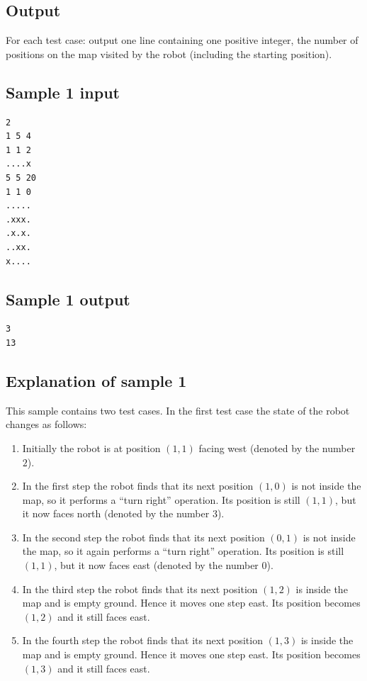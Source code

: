 \documentclass[11pt]{article}
\begin{document}
\subsection*{Output}

For each test case: output one line containing one positive integer, the
number of positions on the map visited by the robot (including the starting
position).

\subsection*{Sample 1 input}

\begin{verbatim}
2
1 5 4
1 1 2
....x
5 5 20
1 1 0
.....
.xxx.
.x.x.
..xx.
x....
\end{verbatim}

\subsection*{Sample 1 output}

\begin{verbatim}
3
13
\end{verbatim}

\subsection*{Explanation of sample 1}

This sample contains two test cases.
In the first test case the state of the robot changes as follows:
\begin{enumerate}
\item Initially the robot is at position $(1, 1)$ facing west (denoted by
the number $2$).
\item In the first step the robot finds that its next position $(1, 0)$ is
not inside the map, so it performs a ``turn right'' operation.
Its position is still $(1, 1)$, but it now faces north (denoted by the
number $3$).
\item In the second step the robot finds that its next position $(0, 1)$ is
not inside the map, so it again performs a ``turn right'' operation.
Its position is still $(1, 1)$, but it now faces east (denoted by the
number $0$).
\item In the third step the robot finds that its next position $(1, 2)$ is
inside the map and is empty ground.
Hence it moves one step east.
Its position becomes $(1, 2)$ and it still faces east.
\item In the fourth step the robot finds that its next position $(1, 3)$ is
inside the map and is empty ground.
Hence it moves one step east.
Its position becomes $(1, 3)$ and it still faces east.
\end{enumerate}
\end{document}
